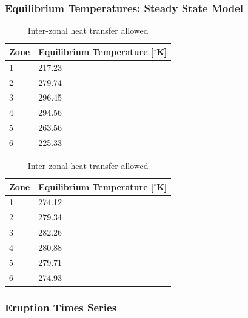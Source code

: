\documentclass{article}
\begin{document}
\subsubsection{Equilibrium Temperatures: Steady State Model}
\begin{table}[H]
    \parbox{.45\linewidth}{
    \captionsetup{singlelinecheck = false, justification=justified}
    \caption{Inter-zonal heat transfer suppressed}
    \begin{tabular}{ll}
    \hline
    Zone & Equilibrium Temperature [$^{\circ}$K] \\
    \hline
    1 & 217.23 \\
    2 & 279.74 \\
    3 & 296.45 \\
    4 & 294.56 \\ 
    5 & 263.56 \\
    6 & 225.33 \\
    \end{tabular}
    \label{tab:supressedteq}
    }
\hfill
    \parbox{.45\linewidth}{
    \captionsetup{singlelinecheck = false, justification=justified}
    \caption{Inter-zonal heat transfer allowed}
    \begin{tabular}{ll}
    \hline
    Zone & Equilibrium Temperature [$^{\circ}$K] \\
    \hline
    1 & 274.12 \\
    2 & 279.34 \\
    3 & 282.26 \\
    4 & 280.88 \\ 
    5 & 279.71 \\
    6 & 274.93 \\
    \end{tabular}
    \label{tab:teq}
    }
\end{table}
\FloatBarrier

\subsubsection{Eruption Times Series}
\begin{table}[H]
    \parbox{.45\linewidth}{
    \captionsetup{singlelinecheck = false, justification=justified}
    \caption{Eruption Times Series 1}
    \label{tab:erupt1}
    }
    \hfill
    \parbox{.45\linewidth}{
    \captionsetup{singlelinecheck = false, justification=justified}
    \caption{Eruption Time Series 2}
    \label{tab:erupt2}
    }
\end{table}
\end{document}
